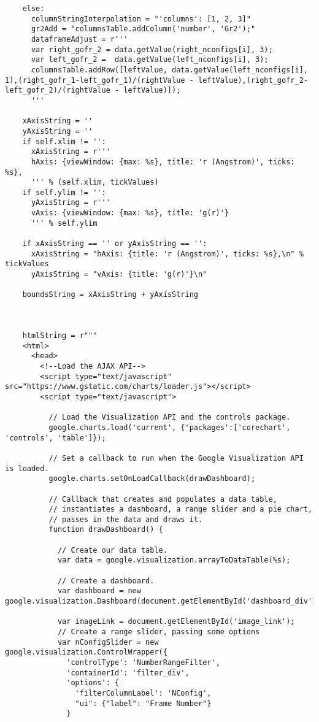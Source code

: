 \begin{verbatim}
    else:
      columnStringInterpolation = "'columns': [1, 2, 3]"
      gr2Add = "columnsTable.addColumn('number', 'Gr2');"
      dataframeAdjust = r'''
      var right_gofr_2 = data.getValue(right_nconfigs[i], 3);
      var left_gofr_2 =  data.getValue(left_nconfigs[i], 3); 
      columnsTable.addRow([leftValue, data.getValue(left_nconfigs[i], 1),(right_gofr_1-left_gofr_1)/(rightValue - leftValue),(right_gofr_2-left_gofr_2)/(rightValue - leftValue)]);
      '''

    xAxisString = ''
    yAxisString = ''
    if self.xlim != '':
      xAxisString = r'''
      hAxis: {viewWindow: {max: %s}, title: 'r (Angstrom)', ticks: %s},
      ''' % (self.xlim, tickValues)
    if self.ylim != '':
      yAxisString = r'''
      vAxis: {viewWindow: {max: %s}, title: 'g(r)'}
      ''' % self.ylim
  
    if xAxisString == '' or yAxisString == '':
      xAxisString = "hAxis: {title: 'r (Angstrom)', ticks: %s},\n" % tickValues
      yAxisString = "vAxis: {title: 'g(r)'}\n" 

    boundsString = xAxisString + yAxisString



    htmlString = r"""
    <html>
      <head>
        <!--Load the AJAX API-->
        <script type="text/javascript" src="https://www.gstatic.com/charts/loader.js"></script>
        <script type="text/javascript">

          // Load the Visualization API and the controls package.
          google.charts.load('current', {'packages':['corechart', 'controls', 'table']});

          // Set a callback to run when the Google Visualization API is loaded.
          google.charts.setOnLoadCallback(drawDashboard);

          // Callback that creates and populates a data table,
          // instantiates a dashboard, a range slider and a pie chart,
          // passes in the data and draws it.
          function drawDashboard() {

            // Create our data table.
            var data = google.visualization.arrayToDataTable(%s);

            // Create a dashboard.
            var dashboard = new google.visualization.Dashboard(document.getElementById('dashboard_div'));

            var imageLink = document.getElementById('image_link');
            // Create a range slider, passing some options
            var nConfigSlider = new google.visualization.ControlWrapper({
              'controlType': 'NumberRangeFilter',
              'containerId': 'filter_div',
              'options': {
                'filterColumnLabel': 'NConfig',
                "ui": {"label": "Frame Number"}
              }
             

\end{verbatim}
